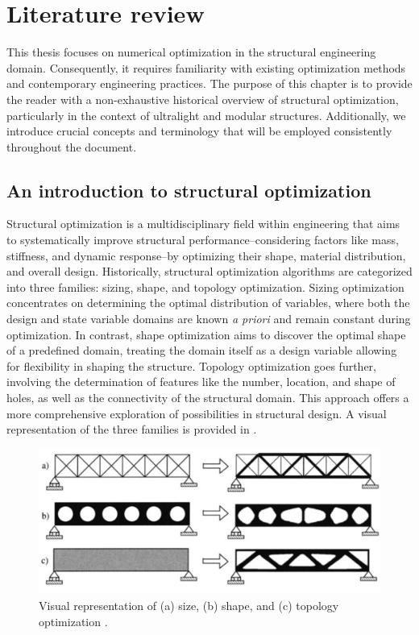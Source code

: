 \setchapterpreamble[u]{\margintoc}
\glsresetall %

\chapter{Literature review} \label{chap:02}
This thesis focuses on numerical optimization in the structural engineering domain. Consequently, it requires familiarity with existing optimization methods and contemporary engineering practices. The purpose of this chapter is to provide the reader with a non-exhaustive historical overview of structural optimization, particularly in the context of ultralight and modular structures. Additionally, we introduce crucial concepts and terminology that will be employed consistently throughout the document.

\section{An introduction to structural optimization}
Structural optimization is a multidisciplinary field within engineering that aims to systematically improve structural performance--considering factors like mass, stiffness, and dynamic response--by optimizing their shape, material distribution, and overall design. Historically, structural optimization algorithms are categorized into three families: sizing, shape, and topology optimization. Sizing optimization concentrates on determining the optimal distribution of variables, where both the design and state variable domains are known \textit{a priori} and remain constant during optimization. In contrast, shape optimization aims to discover the optimal shape of a predefined domain, treating the domain itself as a design variable allowing for flexibility in shaping the structure. Topology optimization goes further, involving the determination of features like the number, location, and shape of holes, as well as the connectivity of the structural domain. This approach offers a more comprehensive exploration of possibilities in structural design. A visual representation of the three families is provided in .

\begin{figure}
    \centering
    \includegraphics[width=\linewidth]{figures/02_literature/opt_family.png}
    \caption{Visual representation of (a) size, (b) shape, and (c) topology optimization \cite{bendsoe_topology_2004}.}
    \label{fig:02_opt_fam}
\end{figure}

